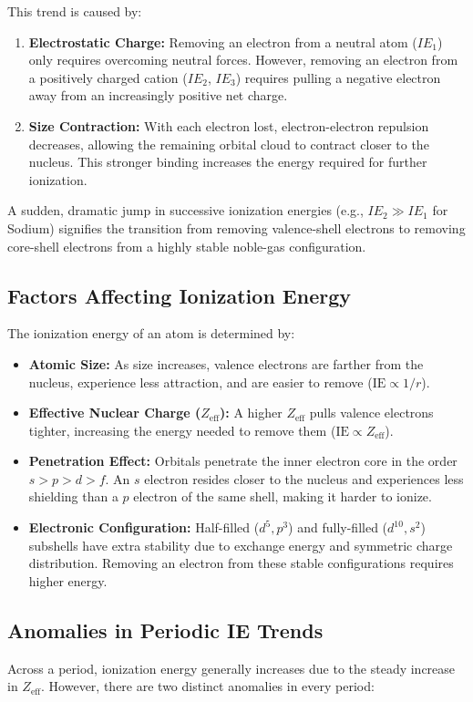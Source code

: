 \documentclass[12pt,a4paper]{article}
\begin{document}
This trend is caused by:
\begin{enumerate}
  \item \textbf{Electrostatic Charge:} Removing an electron from a neutral atom ($IE_1$) only requires overcoming neutral forces. However, removing an electron from a positively charged cation ($IE_2$, $IE_3$) requires pulling a negative electron away from an increasingly positive net charge.
  \item \textbf{Size Contraction:} With each electron lost, electron-electron repulsion decreases, allowing the remaining orbital cloud to contract closer to the nucleus. This stronger binding increases the energy required for further ionization.
\end{enumerate}

A sudden, dramatic jump in successive ionization energies (e.g., $IE_2 \gg IE_1$ for Sodium) signifies the transition from removing valence-shell electrons to removing core-shell electrons from a highly stable noble-gas configuration.

\subsection{Factors Affecting Ionization Energy}
The ionization energy of an atom is determined by:
\begin{itemize}[leftmargin=*, itemsep=2pt]
  \item \textbf{Atomic Size:} As size increases, valence electrons are farther from the nucleus, experience less attraction, and are easier to remove ($\text{IE} \propto 1/r$).
  \item \textbf{Effective Nuclear Charge ($Z_{\text{eff}}$):} A higher $Z_{\text{eff}}$ pulls valence electrons tighter, increasing the energy needed to remove them ($\text{IE} \propto Z_{\text{eff}}$).
  \item \textbf{Penetration Effect:} Orbitals penetrate the inner electron core in the order $s > p > d > f$. An $s$ electron resides closer to the nucleus and experiences less shielding than a $p$ electron of the same shell, making it harder to ionize.
  \item \textbf{Electronic Configuration:} Half-filled ($d^5, p^3$) and fully-filled ($d^{10}, s^2$) subshells have extra stability due to exchange energy and symmetric charge distribution. Removing an electron from these stable configurations requires higher energy.
\end{itemize}

\subsection{Anomalies in Periodic IE Trends}
Across a period, ionization energy generally increases due to the steady increase in $Z_{\text{eff}}$. However, there are two distinct anomalies in every period:
\end{document}

